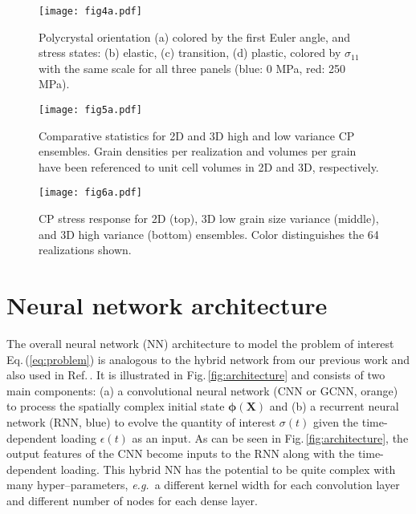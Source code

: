 \documentclass[12pt,reqno]{article}
\newcommand{\ADD}[1]{{#1}}
\newcommand{\fref}[1]{Fig.\,\ref{#1}}
\newcommand{\eref}[1]{Eq.\,(\ref{#1})}
\newcommand{\cref}[1]{Ref.\,\cite{#1}}
\newcommand{\eg}{{\it e.g.}\!\, }
\newcommand{\Xb}{\mathbf{X}}
\newcommand{\phib}{{\boldsymbol{\phi}}}
\begin{document}
\begin{figure}[htb!]
\centering
\texttt{[image: fig4a.pdf]}
\caption{\ADD{Polycrystal orientation (a) colored by the first Euler angle, and stress states: (b) elastic, (c) transition, (d) plastic, colored by $\sigma_{11}$ with the same scale for all three panels (blue: 0 MPa, red: 250 MPa).
}}
\label{fig:stress_field}
\end{figure}

\begin{figure}
\centering
\texttt{[image: fig5a.pdf]}
\caption{Comparative statistics for 2D and 3D high and low variance CP ensembles.
Grain densities per realization and volumes per grain have been referenced to unit cell volumes in 2D and 3D, respectively.
}
\label{fig:ensemble_statistics}
\end{figure}

\begin{figure}
\centering
\texttt{[image: fig6a.pdf]}
\caption{CP stress response for 2D (top), 3D low grain size variance (middle), and 3D high variance (bottom) ensembles.
Color distinguishes the 64 realizations shown.
}
\label{fig:stress_history}
\end{figure}


\section{Neural network architecture} \label{sec:architecture}

The overall neural network (NN) architecture to model the problem of interest \eref{eq:problem} is analogous to the hybrid network from our previous work \cite{frankel2019oligocrystals,frankel2019evolution} and also used in \cref{vlassis2020geometric}.
It is illustrated in \fref{fig:architecture} and consists of two main components: (a) a convolutional neural network (CNN or GCNN, orange) to process the spatially complex initial state $\phib(\Xb)$ and (b) a recurrent neural network (RNN, blue) to evolve the quantity of interest $\sigma(t)$ given the time-dependent loading $\epsilon(t)$ as an input.
As can be seen in \fref{fig:architecture}, the output features of the CNN become inputs to the RNN along with the time-dependent loading.
This hybrid NN has the potential to be quite complex with many hyper--parameters, \eg a different kernel width for each convolution layer and different number of nodes for each dense layer.
\end{document}
